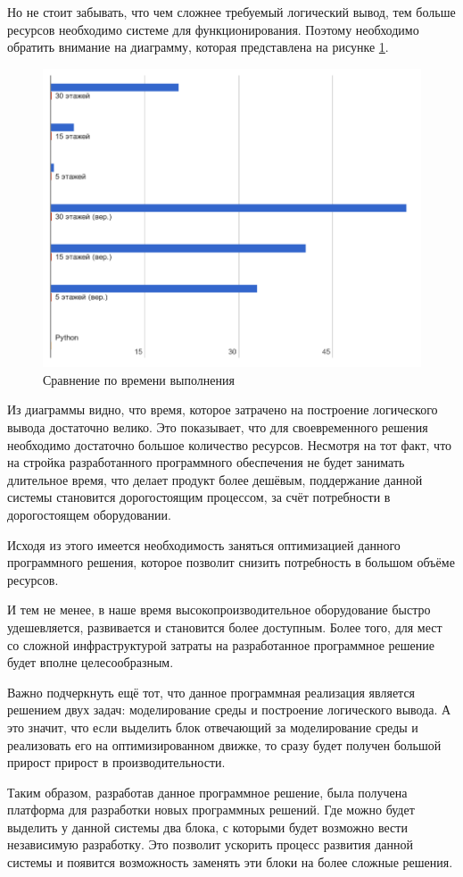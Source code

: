 		Но не стоит забывать, что чем сложнее требуемый логический вывод, тем больше ресурсов необходимо системе для
			функционирования. Поэтому необходимо обратить внимание на диаграмму, которая представлена на рисунке \ref{pt2}.

		\begin{figure}[h]
			\centering
			\includegraphics[width=180mm]{src/pictures/projectp2.png}
			\caption{Сравнение по времени выполнения}\label{pt2}
		\end{figure}

		Из диаграммы видно, что время, которое затрачено на построение логического вывода достаточно велико.
			Это показывает, что для своевременного решения необходимо достаточно большое количество ресурсов.
			Несмотря на тот факт, что на стройка разработанного программного обеспечения не будет занимать
			длительное время, что делает продукт более дешёвым, поддержание данной системы становится
			дорогостоящим процессом, за счёт потребности в дорогостоящем оборудовании.

		Исходя из этого имеется необходимость заняться оптимизацией данного программного решения,
			которое позволит снизить потребность в большом объёме ресурсов.

		И тем не менее, в наше время высокопроизводительное оборудование быстро удешевляется, развивается и
			становится более доступным. Более того, для мест со сложной инфраструктурой затраты на
			разработанное программное решение будет вполне целесообразным.

		Важно подчеркнуть ещё тот, что данное программная реализация является решением двух задач: моделирование 
			среды и построение логического вывода. А это значит, что если выделить блок отвечающий
			за моделирование среды и реализовать его на оптимизированном движке, то сразу будет
			получен большой прирост прирост в производительности.

		Таким образом, разработав данное программное решение, была получена платформа для разработки
			новых программных решений. Где можно будет выделить у данной системы два блока, с которыми
			будет возможно вести независимую разработку. Это позволит ускорить процесс развития данной системы
			и появится возможность заменять эти блоки на более сложные решения.
